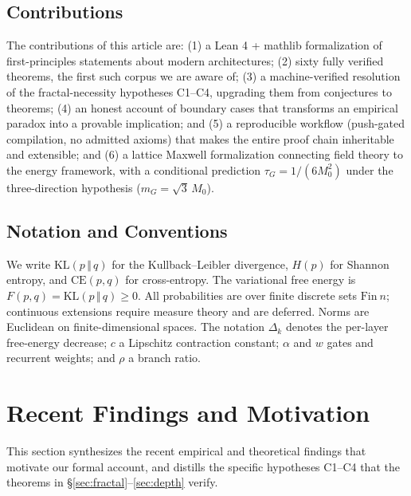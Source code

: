 \documentclass[journal]{IEEEtran}
\begin{document}
\subsection{Contributions}
The contributions of this article are: (1) a Lean 4 + mathlib formalization of
first-principles statements about modern architectures; (2) sixty fully verified
theorems, the first such corpus we are aware of; (3) a machine-verified
resolution of the fractal-necessity hypotheses C1--C4, upgrading them from
conjectures to theorems; (4) an honest account of boundary cases that
transforms an empirical paradox into a provable implication; and (5) a
reproducible workflow (push-gated compilation, no admitted axioms) that makes
the entire proof chain inheritable and extensible; and (6) a lattice Maxwell formalization connecting field theory to the energy framework, with a conditional prediction $\tau_G = 1/(6M_0^2)$ under the three-direction hypothesis ($m_G = \sqrt{3}\,M_0$).

\subsection{Notation and Conventions}
We write $\mathrm{KL}(p\,\Vert\,q)$ for the Kullback--Leibler divergence,
$H(p)$ for Shannon entropy, and $\mathrm{CE}(p,q)$ for cross-entropy. The
variational free energy is $F(p,q)=\mathrm{KL}(p\,\Vert\,q)\ge0$. All
probabilities are over finite discrete sets $\mathrm{Fin}\ n$; continuous
extensions require measure theory and are deferred. Norms are Euclidean on
finite-dimensional spaces. The notation $\Delta_k$ denotes the per-layer
free-energy decrease; $c$ a Lipschitz contraction constant; $\alpha$ and $w$
gates and recurrent weights; and $\rho$ a branch ratio.

\section{Recent Findings and Motivation}
\label{sec:findings}
This section synthesizes the recent empirical and theoretical findings that
motivate our formal account, and distills the specific hypotheses C1--C4 that
the theorems in \S\ref{sec:fractal}--\ref{sec:depth} verify.
\end{document}
